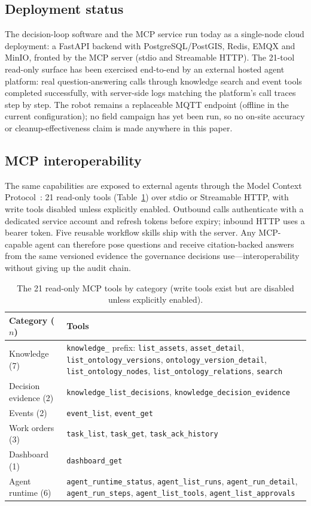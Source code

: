 \documentclass[conference]{IEEEtran}
\begin{document}
\subsection{Deployment status}
The decision-loop software and the MCP service run today as a single-node
cloud deployment: a FastAPI backend with PostgreSQL/PostGIS, Redis, EMQX
and MinIO, fronted by the MCP server (stdio and Streamable HTTP). The
21-tool read-only surface has been exercised end-to-end by an external
hosted agent platform: real question-answering calls through knowledge
search and event tools completed successfully, with server-side logs
matching the platform's call traces step by step. The robot remains a
replaceable MQTT endpoint (offline in the current configuration); no field
campaign has yet been run, so no on-site accuracy or cleanup-effectiveness
claim is made anywhere in this paper.

\subsection{MCP interoperability}
The same capabilities are exposed to external agents through the Model
Context Protocol~\cite{mcp}: 21 read-only tools (Table~\ref{tab:mcp}) over
stdio or Streamable HTTP, with write tools disabled unless explicitly
enabled. Outbound calls authenticate with a dedicated service account and
refresh tokens before expiry; inbound HTTP uses a bearer token. Five
reusable workflow skills ship with the server. Any MCP-capable agent can
therefore pose questions and receive citation-backed answers from the same
versioned evidence the governance decisions use---interoperability without
giving up the audit chain.

\begin{table}[t]
\caption{The 21 read-only MCP tools by category (write tools exist but are
disabled unless explicitly enabled).}
\label{tab:mcp}
\centering
\small
\begin{tabular}{lp{5.1cm}}
\toprule
Category ($n$) & Tools \\
\midrule
Knowledge (7) & \texttt{knowledge\_} prefix: \texttt{list\_assets},
\texttt{asset\_detail}, \texttt{list\_ontology\_versions},
\texttt{ontology\_version\_detail}, \texttt{list\_ontology\_nodes},
\texttt{list\_ontology\_relations}, \texttt{search} \\
Decision evidence (2) & \texttt{knowledge\_list\_decisions},
\texttt{knowledge\_\allowbreak decision\_\allowbreak evidence} \\
Events (2) & \texttt{event\_list}, \texttt{event\_get} \\
Work orders (3) & \texttt{task\_list}, \texttt{task\_get},
\texttt{task\_ack\_history} \\
Dashboard (1) & \texttt{dashboard\_get} \\
Agent runtime (6) & \texttt{agent\_runtime\_status},
\texttt{agent\_list\_runs}, \texttt{agent\_run\_detail},
\texttt{agent\_run\_steps}, \texttt{agent\_list\_tools},
\texttt{agent\_list\_approvals} \\
\bottomrule
\end{tabular}
\end{table}
\end{document}
